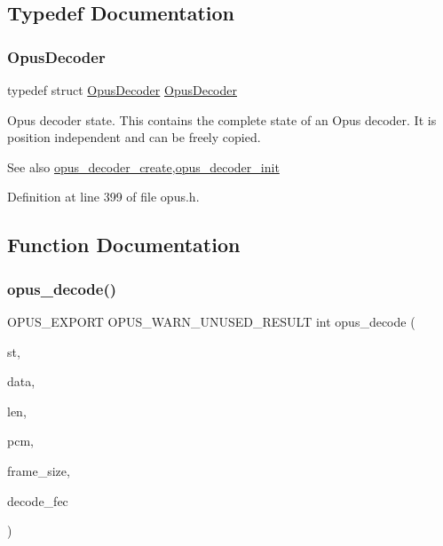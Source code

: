 \subsection{Typedef Documentation}
\mbox{\label{group__opus__decoder_ga401d8579958d36094715a6b90cd159a6}} 
\subsubsection{\texorpdfstring{OpusDecoder}{OpusDecoder}}
{\footnotesize\ttfamily typedef struct \mbox{\hyperlink{group__opus__decoder_ga401d8579958d36094715a6b90cd159a6}{Opus\+Decoder}} \mbox{\hyperlink{group__opus__decoder_ga401d8579958d36094715a6b90cd159a6}{Opus\+Decoder}}}

Opus decoder state. This contains the complete state of an Opus decoder. It is position independent and can be freely copied. \begin{DoxySeeAlso}{See also}
\mbox{\hyperlink{group__opus__decoder_ga6a06f16309dee5883c27223d127c4300}{opus\+\_\+decoder\+\_\+create}},\mbox{\hyperlink{group__opus__decoder_ga40746b48a7b1653987a3a6db2ce3a40b}{opus\+\_\+decoder\+\_\+init}} 
\end{DoxySeeAlso}


Definition at line 399 of file opus.\+h.



\subsection{Function Documentation}
\mbox{\label{group__opus__decoder_ga3df1ea406cd9d23a63aed181903d3e5e}} 
\subsubsection{\texorpdfstring{opus\_decode()}{opus\_decode()}}
{\footnotesize\ttfamily O\+P\+U\+S\+\_\+\+E\+X\+P\+O\+RT O\+P\+U\+S\+\_\+\+W\+A\+R\+N\+\_\+\+U\+N\+U\+S\+E\+D\+\_\+\+R\+E\+S\+U\+LT int opus\+\_\+decode (\begin{DoxyParamCaption}\item[{\mbox{\hyperlink{group__opus__decoder_ga401d8579958d36094715a6b90cd159a6}{Opus\+Decoder}} $\ast$}]{st,  }\item[{const unsigned char $\ast$}]{data,  }\item[{\mbox{\hyperlink{opus__types_8h_aa4d309d6f80b99dbabebc8f98879ab9a}{opus\+\_\+int32}}}]{len,  }\item[{\mbox{\hyperlink{opus__types_8h_acc9ed7cf60479eb81f9648c6ec27dc26}{opus\+\_\+int16}} $\ast$}]{pcm,  }\item[{int}]{frame\+\_\+size,  }\item[{int}]{decode\+\_\+fec }\end{DoxyParamCaption})}

